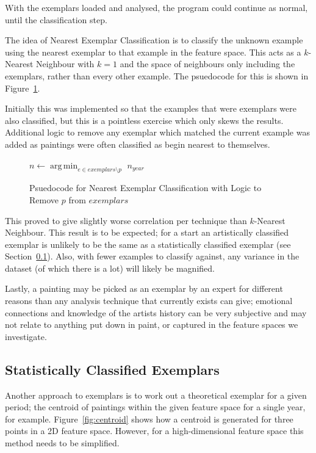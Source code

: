 With the exemplars loaded and analysed, the program could continue as normal, until the
classification step.

The idea of Nearest Exemplar Classification is to classify the unknown example using the nearest
exemplar to that example in the feature space. This acts as a $k$-Nearest Neighbour with $k=1$ and
the space of neighbours only including the exemplars, rather than every other example. The 
psuedocode for this is shown in Figure~\ref{fig:nec-psuedo}.

Initially this was implemented so that the examples that were exemplars were also classified, but
this is a pointless exercise which only skews the results. Additional logic to remove any exemplar
which matched the current example was added as paintings were often classified as begin nearest to
themselves.

\begin{figure}[h]
\begin{algorithmic}
\State $n \gets \operatorname*{arg\,min}_{e \in exemplars \setminus p}$ 
\State \Return $n_{year}$
\EndFunction
\end{algorithmic}
\caption[Psuedocode for Nearest Exemplar Classification with Added Logic]{Psuedocode for Nearest Exemplar Classification with Logic to Remove $p$ from $exemplars$}\label{fig:nec-psuedo}
\end{figure}

This proved to give slightly worse correlation per technique than $k$-Nearest Neighbour. This 
result is to be expected; for a start an artistically classified exemplar is unlikely to be the
same as a statistically classified exemplar (see Section~\ref{sec:sce}). Also, with fewer examples
to classify against, any variance in the dataset (of which there is a lot) will likely be 
magnified.

Lastly, a painting may be picked as an exemplar by an expert for different reasons than any
analysis technique that currently exists can give; emotional connections and knowledge of the
artists history can be very subjective and may not relate to anything put down in paint, or 
captured in the feature spaces we investigate.


\subsection{Statistically Classified Exemplars}\label{sec:sce}

Another approach to exemplars is to work out a theoretical exemplar for a given period; the 
centroid of paintings within the given feature space for a single year, for example. 
Figure~\ref{fig:centroid} shows how a centroid is generated for three points in a 2D feature
space. However, for a high-dimensional feature space this method needs to be simplified.

